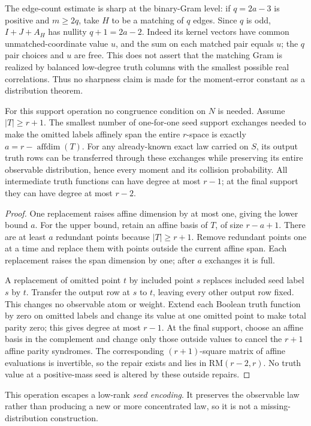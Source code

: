 The edge-count estimate is sharp at the binary-Gram level: if
$q=2a-3$ is positive and $m\ge2q$, take $H$ to be a matching of $q$
edges. Since $q$ is odd, $I+J+A_H$ has nullity $q+1=2a-2$.
Indeed its kernel vectors have common unmatched-coordinate value $u$,
and the sum on each matched pair equals $u$; the $q$ pair choices and
$u$ are free. This does not assert that the matching Gram is realized
by balanced low-degree truth columns with the smallest possible real
correlations. Thus no sharpness claim is made for the moment-error
constant as a distribution theorem.

\begin{theorem}
\label{thm:nonlinear-minimum-edits}
For this support operation no congruence condition on $N$ is needed.
Assume $|T|\ge r+1$. The smallest number of one-for-one seed support
exchanges needed to make the omitted labels affinely span the entire
$r$-space is exactly $a=r-\operatorname{affdim}(T)$.
For any already-known exact law carried on $S$, its output truth rows
can be transferred through these exchanges while preserving its entire
observable distribution, hence every moment and its collision probability.
All intermediate truth functions can have degree at most $r-1$; at the
final support they can have degree at most $r-2$.
\end{theorem}
\begin{proof}
One replacement raises affine dimension by at most one, giving the
lower bound $a$. For the upper bound, retain an affine basis of $T$,
of size $r-a+1$. There are at least $a$ redundant points because
$|T|\ge r+1$. Remove redundant points one at a time and replace them
with points outside the current affine span. Each replacement raises
the span dimension by one; after $a$ exchanges it is full.

A replacement of omitted point $t$ by included point $s$ replaces
included seed label $s$ by $t$. Transfer the output row at $s$ to $t$,
leaving every other output row fixed. This changes no observable atom
or weight. Extend each Boolean truth function by zero on omitted labels
and change its value at one omitted point to make total parity zero;
this gives degree at most $r-1$. At the final support, choose an affine
basis in the complement and change only those outside values to cancel
the $r+1$ affine parity syndromes. The corresponding $(r+1)$-square
matrix of affine evaluations is invertible, so the repair exists and
lies in $\mathrm{RM}(r-2,r)$. No truth value at a positive-mass seed is
altered by these outside repairs.
\end{proof}
This operation escapes a low-rank \emph{seed encoding}. It preserves the
observable law rather than producing a new or more concentrated law,
so it is not a missing-distribution construction.

